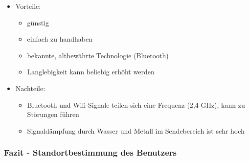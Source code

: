 \begin{itemize}
	\item Vorteile:
	\begin{itemize}
		\item günstig
		\item einfach zu handhaben
		\item bekannte, altbewährte Technologie (Bluetooth)
		\item Langlebigkeit kann beliebig erhöht werden
	\end{itemize}
	\item Nachteile:
	\begin{itemize}
		\item Bluetooth und Wifi-Signale teilen sich eine Frequenz (2,4 GHz), kann zu Störungen führen
		\item Signaldämpfung durch Wasser und Metall im Sendebereich ist sehr hoch
	\end{itemize}
\end{itemize}

\subsubsection{Fazit - Standortbestimmung des Benutzers}
\label{sec:Fazit - Standortbestimmung}

